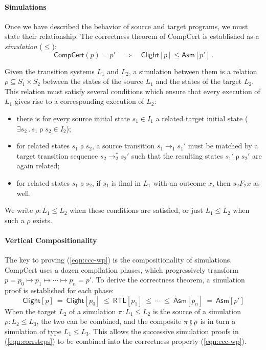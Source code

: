 \documentclass[acmsmall,screen,review,anonymous,nonacm]{acmart}
\newcommand{\kw}[1]{\ensuremath{ \mathsf{#1} }}
\newcommand{\vcomp}{\fatsemi}
\begin{document}

\paragraph{Simulations} %

Once we have described
the behavior of source and target programs,
we must state their relationship.
The correctness theorem of CompCert is established as a \emph{simulation} ($\le$):
\begin{equation}
    \kw{CompCert}(p) = p'
    \quad\Longrightarrow\quad
    \kw{Clight}[p] \le \kw{Asm}[p']
    \,.
    \label{eqn:ccc-wp}
\end{equation}

Given the transition systems $L_1$ and $L_2$,
a simulation between them is a relation $\rho \subseteq S_1 \times S_2$
between the states of the source $L_1$
and the states of the target $L_2$.
This relation must satisfy several conditions
which ensure that
every execution of $L_1$ gives rise
to a corresponding execution of $L_2$:
\begin{itemize}
  \item there is for every source initial state $s_1 \in I_1$
    a related target initial state
    ($\exists s_2 \mathbin. s_1 \mathrel\rho s_2 \in I_2$);
  \item for related states $s_1 \mathrel\rho s_2$,
    a source transition $s_1 \rightarrow_1 s_1'$ must be matched by
    a target transition sequence $s_2 \rightarrow_2^* s_2'$ such that
    the resulting states $s_1' \mathrel\rho s_2'$ are again related;
  \item for related states $s_1 \mathrel\rho s_2$,
    if $s_1$ is final in $L_1$ with an outcome $x$,
    then $s_2 \mathrel{F_2} x$ as well.
\end{itemize}
We write $\rho : L_1 \le L_2$ when these conditions are satisfied,
or just $L_1 \le L_2$ when such a $\rho$ exists.


\paragraph{Vertical Compositionality} %

The key to proving (\ref{eqn:ccc-wp}) is the compositionality of simulations.
CompCert uses a dozen compilation phases,
which progressively transform %
$
  p = p_0 \longmapsto p_1 \longmapsto \cdots \longmapsto p_n = p'
$.
To derive the correctness theorem,
a simulation proof is established for each phase:
\begin{equation}
  \kw{Clight}[p] \:=\:
  \kw{Clight}[p_0] \:\le\: \kw{RTL}[p_1] \:\le\: \cdots \:\le\: \kw{Asm}[p_n]
  \:=\: \kw{Asm}[p']
  \label{eqn:corrsteps}
\end{equation}
When the target $L_2$ of a simulation $\pi : L_1 \le L_2$
is the source of a simulation $\rho : L_2 \le L_3$,
the two can be combined, and the composite
$\pi \vcomp \rho$
is in turn a simulation of type $L_1 \le L_3$.
This allows
the successive simulation proofs in (\ref{eqn:corrsteps})
to be combined into the correctness property (\ref{eqn:ccc-wp}).
\end{document}
